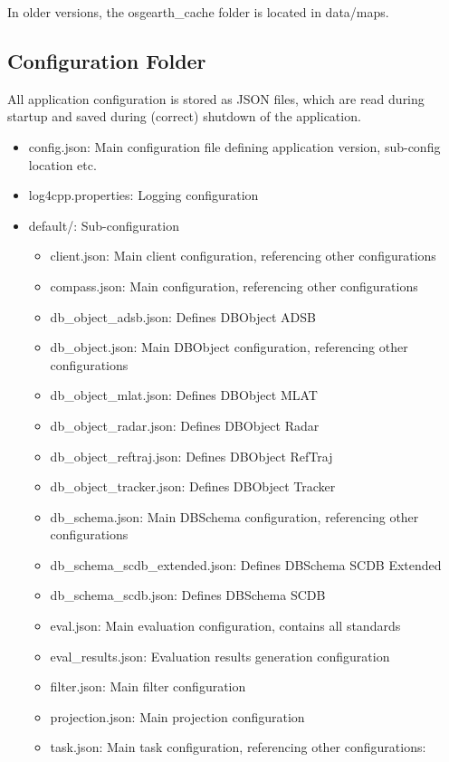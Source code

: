 In older versions, the osgearth\_cache folder is located in data/maps.

\subsection{Configuration Folder}
\label{sec:appendix_config_config_folder}

All application configuration is stored as JSON files, which are read during startup and saved during (correct) shutdown of the application.

\begin{itemize}
\item config.json: Main configuration file defining application version, sub-config location etc.
\item log4cpp.properties: Logging configuration
\item default/: Sub-configuration
\begin{itemize}
    \item client.json: Main client configuration, referencing other configurations
    \item compass.json: Main configuration, referencing other configurations
    \item db\_object\_adsb.json: Defines DBObject ADSB
    \item db\_object.json: Main DBObject configuration, referencing other configurations
    \item db\_object\_mlat.json: Defines DBObject MLAT
    \item db\_object\_radar.json: Defines DBObject Radar
    \item db\_object\_reftraj.json: Defines DBObject RefTraj
    \item db\_object\_tracker.json: Defines DBObject Tracker
    \item db\_schema.json: Main DBSchema configuration, referencing other configurations
    \item db\_schema\_scdb\_extended.json: Defines DBSchema SCDB Extended
    \item db\_schema\_scdb.json: Defines DBSchema SCDB
    \item eval.json: Main evaluation configuration, contains all standards
    \item eval\_results.json: Evaluation results generation configuration
    \item filter.json: Main filter configuration
    \item projection.json: Main projection configuration
    \item task.json: Main task configuration, referencing other configurations:

\end{itemize}
\end{itemize}

